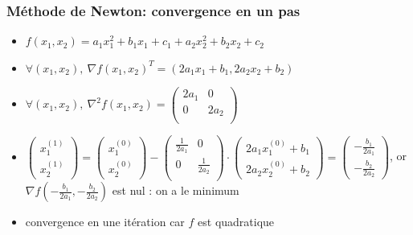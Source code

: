 \documentclass{beamer}
\begin{document}
\begin{frame}
  \frametitle{Méthode de Newton: convergence en un pas}

  \begin{itemize}
  \item $f(x_1,x_2) = a_1x_1^2 + b_1x_1 + c_1 + a_2x_2^2 + b_2x_2 + c_2$
  \item 
    $\forall (x_1,x_2), \ {\nabla f}(x_1,x_2)^T = (2a_1x_1 + b_1,2a_2x_2 + b_2)$
  \item 
  $ \forall (x_1,x_2), \ \nabla^2f(x_1,x_2) =
  \left(\begin{array}{cc}
    2a_1 & 0 \\
    0 & 2a_2 \\
  \end{array}
  \right)
  $
  \end{itemize}

  \begin{itemize}
  \item $\left( \begin{array}{c} x_1^{(1)} \\ x_2^{(1)} \end{array} \right ) =
    \left( \begin{array}{c} x_1^{(0)} \\ x_2^{(0)} \end{array} \right ) -
  \left(\begin{array}{cc} \frac{1}{2a_1} & 0 \\ 0 & \frac{1}{2a_2} \\ \end{array} \right) \cdot
  \left( \begin{array}{c} 2a_1x_1^{(0)} + b_1 \\ 2a_2x_2^{(0)} + b_2 \end{array} \right ) =
  \left( \begin{array}{c} -\frac{b_1}{2a_1} \\ -\frac{b_2}{2a_2} \end{array} \right ) $, or
  ${\nabla f}(-\frac{b_1}{2a_1}, -\frac{b_2}{2a_2})$ est nul : on a le minimum
  \item convergence en une itération car $f$ est quadratique
  \end{itemize}
  
\end{frame}
\end{document}
